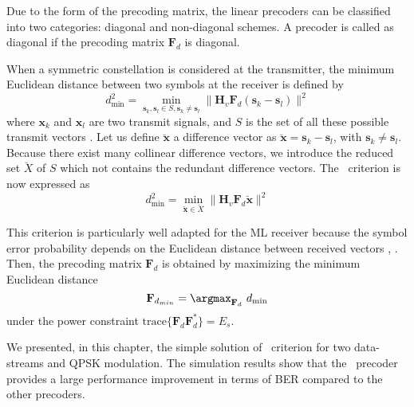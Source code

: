 Due to the form of the precoding matrix, the linear precoders can be classified into two categories: diagonal and non-diagonal schemes. A precoder is called as diagonal if the precoding matrix $\mathbf{F}_d$ is diagonal. 

When a symmetric constellation is considered at the transmitter, the minimum Euclidean distance between two symbols at the receiver is defined by 
\begin{equation}
	d_{\min}^2=\min_{\mathbf{s}_k,\mathbf{s}_l\in S,\mathbf{s}_k\neq \mathbf{s}_l} \|\mathbf{H}_v\mathbf{F}_d(\mathbf{s}_k-\mathbf{s}_l)\|^2
\end{equation}
where $\mathbf{x}_k$ and $\mathbf{x}_l$ are two transmit signals, and $S$ is the set of all these possible transmit vectors . Let us define $\breve{\mathbf{x}}$ a difference vector as $\breve{\mathbf{x}} = \mathbf{s}_k - \mathbf{s}_l$, with $\mathbf{s}_k\neq \mathbf{s}_l$. Because there exist many collinear difference vectors, we introduce the reduced set $\breve{X}$ of $S$ which not contains the redundant difference vectors. The \dmin\ criterion is now expressed as 
\begin{equation}
\label{eq:ab_dmin}
	d_{\min}^2=\min_{\breve{\mathbf{x}} \in \breve{X}} \|\mathbf{H}_v\mathbf{F}_d \breve{\mathbf{x}}\|^2
\end{equation}

This criterion is particularly well adapted for the ML receiver because the symbol error probability depends on the Euclidean distance between received vectors \cite{lamy2000orr}, \cite{vanNee2000mld}. Then, the precoding matrix $\mathbf{F}_d$ is obtained by maximizing the minimum Euclidean distance 
\begin{equation}
\label{eq:ab_precoder}
	\mathbf{F}_{d_{min}}= \argmax_{\mathbf{F}_d} \ d_{\min}
\end{equation}
under the power constraint $\text{trace}\{\mathbf{F}_d\mathbf{F}_d^*\}= E_s$.

We presented, in this chapter, the simple solution of \dmin\ criterion for two data-streams and QPSK modulation. The simulation results show that the \maxdmin\ precoder provides a large performance improvement in terms of BER compared to the other precoders.

